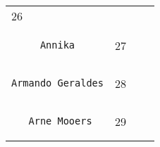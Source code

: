 \documentclass[]{article}
\begin{document}
\begin{longtable}[c]{@{}llll@{}}
\begin{minipage}[t]{0.10\columnwidth}
26
\end{minipage} & \begin{minipage}[t]{0.13\columnwidth}\raggedright
\end{minipage} & \begin{minipage}[t]{0.15\columnwidth}\raggedright
\end{minipage}
\\\noalign{\medskip}
\begin{minipage}[t]{0.39\columnwidth}\raggedright
\begin{verbatim}
     Annika
\end{verbatim}
\end{minipage} & \begin{minipage}[t]{0.10\columnwidth}\raggedright
27
\end{minipage} & \begin{minipage}[t]{0.13\columnwidth}\raggedright
\end{minipage} & \begin{minipage}[t]{0.15\columnwidth}\raggedright
\end{minipage}
\\\noalign{\medskip}
\begin{minipage}[t]{0.39\columnwidth}\raggedright
\begin{verbatim}
Armando Geraldes
\end{verbatim}
\end{minipage} & \begin{minipage}[t]{0.10\columnwidth}\raggedright
28
\end{minipage} & \begin{minipage}[t]{0.13\columnwidth}\raggedright
\end{minipage} & \begin{minipage}[t]{0.15\columnwidth}\raggedright
\end{minipage}
\\\noalign{\medskip}
\begin{minipage}[t]{0.39\columnwidth}\raggedright
\begin{verbatim}
   Arne Mooers
\end{verbatim}
\end{minipage} & \begin{minipage}[t]{0.10\columnwidth}\raggedright
29
\end{minipage} & \begin{minipage}[t]{0.13\columnwidth}\raggedright
\end{minipage} & \begin{minipage}[t]{0.15\columnwidth}\raggedright

\end{minipage}
\end{longtable}
\end{document}
